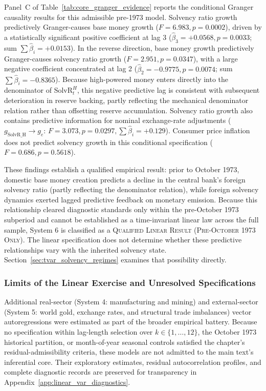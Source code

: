 Panel~C of Table~\ref{tab:core_granger_evidence} reports the conditional Granger causality results for this admissible pre-1973 model. Solvency ratio growth predictively Granger-causes base money growth ($F = 6.983, p = 0.0002$), driven by a statistically significant positive coefficient at lag 3 ($\hat{\beta}_3 = +0.0568, p = 0.0033$; sum $\sum \hat{\beta}_i = +0.0153$). In the reverse direction, base money growth predictively Granger-causes solvency ratio growth ($F = 2.951, p = 0.0347$), with a large negative coefficient concentrated at lag 2 ($\hat{\beta}_2 = -0.9775, p = 0.0074$; sum $\sum \hat{\beta}_i = -0.8365$). Because high-powered money enters directly into the denominator of $\text{SolvR}^H_t$, this negative predictive lag is consistent with subsequent deterioration in reserve backing, partly reflecting the mechanical denominator relation rather than offsetting reserve accumulation. Solvency ratio growth also contains predictive information for nominal exchange-rate adjustments ($g_{\text{SolvR\_H}} \to g_e$: $F = 3.073, p = 0.0297, \sum \hat{\beta}_i = +0.129$). Consumer price inflation does not predict solvency growth in this conditional specification ($F = 0.686, p = 0.5618$).

These findings establish a qualified empirical result: prior to October 1973, domestic base money creation predicts a decline in the central bank's foreign solvency ratio (partly reflecting the denominator relation), while foreign solvency dynamics exerted lagged predictive feedback on monetary emission. Because this relationship cleared diagnostic standards only within the pre-October 1973 subperiod and cannot be established as a time-invariant linear law across the full sample, System 6 is classified as a \textsc{Qualified Linear Result (Pre-October 1973 Only)}. The linear specification does not determine whether these predictive relationships vary with the inherited solvency state. Section~\ref{sec:tvar_solvency_regimes} examines that possibility directly.



\subsubsection{Limits of the Linear Exercise and Unresolved Specifications}
\label{sec:granger_limits}
\label{sec:sign_tournament_synthesis}
\label{sec:granger_diagnostics}

Additional real-sector (System 4: manufacturing and mining) and external-sector (System 5: world gold, exchange rates, and structural trade imbalances) vector autoregressions were estimated as part of the broader empirical battery. Because no specification within lag-length selection over $k \in \{1, \dots, 12\}$, the October 1973 historical partition, or month-of-year seasonal controls satisfied the chapter's residual-admissibility criteria, these models are not admitted to the main text's inferential core. Their exploratory estimates, residual autocorrelation profiles, and complete diagnostic records are preserved for transparency in Appendix~\ref{app:linear_var_diagnostics}.

